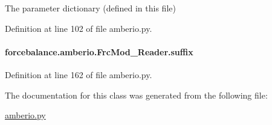 The parameter dictionary (defined in this file) 



Definition at line 102 of file amberio.\-py.

\hypertarget{classforcebalance_1_1amberio_1_1FrcMod__Reader_a4757a1ec953e5be7f8593071e0698731}{
\paragraph[{suffix}]{\setlength{\rightskip}{0pt plus 5cm}forcebalance.\-amberio.\-Frc\-Mod\-\_\-\-Reader.\-suffix}}\label{classforcebalance_1_1amberio_1_1FrcMod__Reader_a4757a1ec953e5be7f8593071e0698731}


Definition at line 162 of file amberio.\-py.



The documentation for this class was generated from the following file\-:\begin{DoxyCompactItemize}
\item 
\hyperlink{amberio_8py}{amberio.\-py}\end{DoxyCompactItemize}
